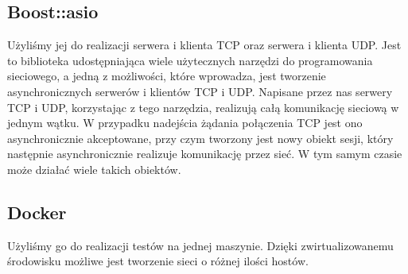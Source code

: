 \documentclass[11pt,oneside]{book}
\newcommand{\+}{\discretionary{\mbox{\scriptsize$\hookleftarrow$}}{}{}}
\begin{document}
\subsection{Boost::asio}
Użyliśmy jej do realizacji serwera i klienta TCP oraz serwera i klienta UDP. Jest to biblioteka udostępniająca wiele użytecznych narzędzi do programowania sieciowego, a jedną z możliwości, które wprowadza, jest tworzenie asynchronicznych serwerów i klientów TCP i UDP. Napisane przez nas serwery TCP i UDP, korzystając z tego narzędzia, realizują całą komunikację sieciową w jednym wątku. 
W przypadku nadejścia żądania połączenia TCP jest ono asynchronicznie akceptowane, przy czym tworzony jest nowy obiekt sesji, który następnie asynchronicznie realizuje komunikację przez sieć. W tym samym czasie może działać wiele takich obiektów.
\subsection{Docker}
Użyliśmy go do realizacji testów na jednej maszynie. Dzięki zwirtualizowanemu środowisku możliwe jest tworzenie sieci o różnej ilości hostów.
\end{document}
